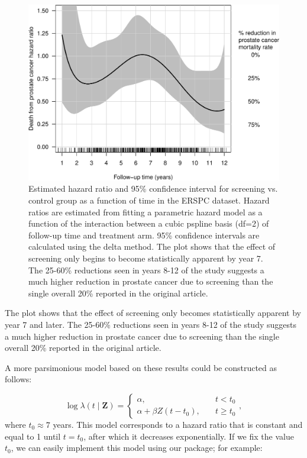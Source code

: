 \begin{figure}[ht]
\includegraphics[width=\textwidth,keepaspectratio=true]{./interaction-ERSPC-1} \caption{Estimated hazard ratio and 95\% confidence interval for screening vs. control group as a function of time in the ERSPC dataset. Hazard ratios are estimated from fitting a parametric hazard model as a function of the interaction between a cubic pspline basis (df=2) of follow-up time and treatment arm. 95\% confidence intervals are calculated using the delta method. The plot shows that the effect of screening only begins to become statistically apparent by year 7. The 25-60\% reductions seen in years 8-12 of the study suggests a much higher reduction in prostate cancer due to screening than the single overall 20\% reported in the original article.}\label{fig:interaction-ERSPC}
\end{figure}

The plot shows that the effect of screening only becomes statistically apparent by year 7 and later. The 25-60\% reductions seen in years 8-12 of the study suggests a much higher reduction in prostate cancer due to screening than the single overall 20\% reported in the original article.

A more parsimonious model based on these results could be constructed as follows:

\[ \log \lambda\left(t \mid \mathbf{Z}\right) = \begin{cases} \alpha, &\quad t < t_0\\
\alpha + \beta Z(t - t_0), &\quad t \geq t_0\end{cases},\]
where \(t_0 \approx 7\) years. This model corresponds to a hazard ratio that is constant and equal to 1 until \(t = t_0\), after which it decreases exponentially. If we fix the value \(t_0\), we can easily implement this model using our package; for example:

